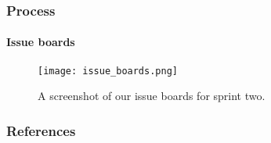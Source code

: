\documentclass{beamer}
\begin{document}
\begin{frame}[t]
	\frametitle{Process}
	\framesubtitle{Issue boards}
	\begin{figure}
		\texttt{[image: issue\_boards.png]}
		\caption{A screenshot of our issue boards for sprint two.}
	\end{figure}
\end{frame}


\begin{frame}[t]
	\frametitle{References}
	
	
\end{frame}
\end{document}
